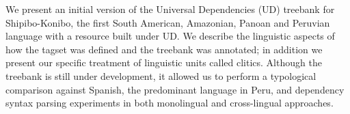 We present an initial version of the Universal Dependencies (UD) treebank for Shipibo-Konibo, the first South American, Amazonian, Panoan and Peruvian language with a resource built under UD. We describe the linguistic aspects of how the tagset was defined and the treebank was annotated; in addition we present our specific treatment of linguistic units called clitics. Although the treebank is still under development, it allowed us to perform a typological comparison against Spanish, the predominant language in Peru, and dependency syntax parsing experiments in both monolingual and cross-lingual approaches.
